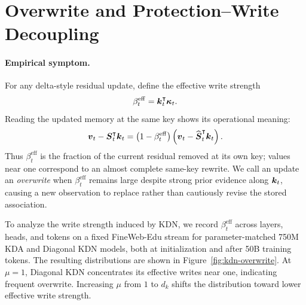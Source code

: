 \documentclass{article} %
\begin{document}
\section{Overwrite and Protection--Write Decoupling}
\label{app:protection-write}

\paragraph{Empirical symptom.}
For any delta-style residual update, define the effective write strength
\begin{equation}
  \beta_t^{\mathrm{eff}}
  =\boldsymbol{k}_t^{\intercal}\boldsymbol{\kappa}_t.
  \label{eq:appendix-effective-write}
\end{equation}
Reading the updated memory at the same key shows its operational meaning:
\begin{equation}
  \boldsymbol{v}_t-\boldsymbol{S}_t^{\intercal}\boldsymbol{k}_t
  =\left(1-\beta_t^{\mathrm{eff}}\right)
   \left(\boldsymbol{v}_t-\widehat{\boldsymbol{S}}_t^{\intercal}\boldsymbol{k}_t\right).
  \label{eq:appendix-effective-write-residual}
\end{equation}
Thus $\beta_t^{\mathrm{eff}}$ is the fraction of the current residual removed at its own key;
values near one correspond to an almost complete same-key rewrite. We call an update an
\emph{overwrite} when $\beta_t^{\mathrm{eff}}$ remains large despite strong prior evidence along
$\boldsymbol{k}_t$, causing a new observation to replace rather than cautiously revise the stored
association.

To analyze the write strength induced by KDN, we record $\beta_t^{\mathrm{eff}}$ across layers,
heads, and tokens on a fixed FineWeb-Edu stream for parameter-matched 750M KDA and Diagonal KDN
models, both at initialization and after 50B training tokens. The resulting distributions are shown
in Figure~\ref{fig:kdn-overwrite}. At $\mu=1$, Diagonal KDN concentrates its effective writes near
one, indicating frequent overwrite. Increasing $\mu$ from $1$ to $d_k$ shifts the distribution
toward lower effective write strength.
\end{document}
